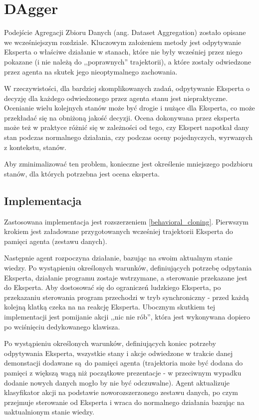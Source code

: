 \section{DAgger}\label{dagger}

Podejście Agregacji Zbioru Danych (ang. Dataset Aggregation) \cite{DBLP:journals/corr/abs-1011-0686} zostało opisane we wcześniejszym rozdziale. Kluczowym założeniem metody jest odpytywanie Eksperta o właściwe działanie w stanach, które nie były wcześniej przez niego pokazane (i nie należą do ,,poprawnych'' trajektorii), a które zostały odwiedzone przez agenta na skutek jego nieoptymalnego zachowania.

W rzeczywistości, dla bardziej skomplikowanych zadań, odpytywanie Eksperta o decyzję dla każdego odwiedzonego przez agenta stanu jest niepraktyczne. Ocenianie wielu kolejnych stanów może być drogie i nużące dla Eksperta, co może przekładać się na obniżoną jakość decyzji. Ocena dokonywana przez eksperta może też w praktyce różnić się w zależności od tego, czy Ekspert napotkał dany stan podczas normalnego działania, czy podczas oceny pojednyczych, wyrwanych z kontekstu, stanów.

Aby zminimalizować ten problem, konieczne jest określenie mniejszego podzbioru stanów, dla których potrzebna jest ocena eksperta.


\subsection{Implementacja} 
Zastosowana implementacja jest rozszerzeniem \ref{behavioral_cloning}. Pierwszym krokiem jest załadowane przygotowanych wcześniej trajektorii Eksperta do pamięci agenta (zestawu danych).

Następnie agent rozpoczyna działanie, bazując na swoim aktualnym stanie wiedzy. Po wystąpieniu określonych warunków, definiujących potrzebę odpytania Eksperta, działanie programu zostaje wstrzymane, a sterowanie przekazane jest do Eksperta. Aby dostosować się do ograniczeń ludzkiego Eksperta, po przekazaniu sterowania program przechodzi w tryb synchroniczny - przed każdą kolejną klatką czeka na na reakcję Eksperta. Ubocznym skutkiem tej implementacji jest pomijanie akcji ,,nic nie rób'', która jest wykonywana dopiero po wciśnięciu dedykowanego klawisza.

Po wystąpieniu określonych warunków, definiujących koniec potrzeby odpytywania Eksperta, wszystkie stany i akcje odwiedzone w trakcie danej demonstacji dodawane są do pamięci agenta (trajektoria może być dodana do pamięci z większą wagą niż początkowe prezentacje - w przeciwnym wypadku dodanie nowych danych mogło by nie być odczuwalne). Agent aktualizuje klasyfikator akcji na podstawie noworozszerzonego zestawu danych, po czym przejmuje sterowanie od Eksperta i wraca do normalnego działania bazując na uaktualnionym stanie wiedzy.

